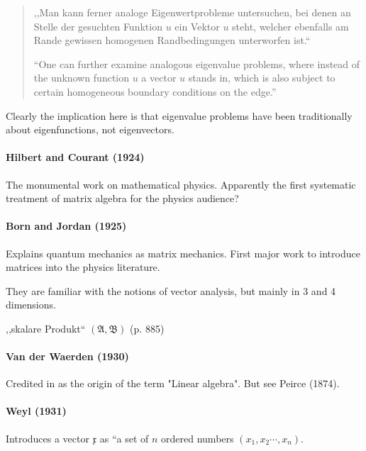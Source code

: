 \begin{quote}
,,Man kann ferner analoge Eigenwertprobleme untersuchen, bei denen an Stelle der gesuchten Funktion $u$ ein Vektor $u$ steht, welcher ebenfalls am Rande gewissen homogenen Randbedingungen unterworfen ist.``

``One can further examine analogous eigenvalue problems, where instead of the unknown function $u$ a vector $u$ stands in, which is also subject to certain homogeneous boundary conditions on the edge.''
\end{quote}

Clearly the implication here is that eigenvalue problems have been traditionally about eigenfunctions, not eigenvectors.



\paragraph{Hilbert and Courant (1924)}

The monumental work on mathematical physics. Apparently the first systematic treatment of matrix algebra for the physics audience?



\paragraph{Born and Jordan (1925)~\cite{Born1925}}

Explains quantum mechanics as matrix mechanics. First major work to introduce matrices into the physics literature.

They are familiar with the notions of vector analysis, but mainly in 3 and 4 dimensions.

,,skalare Produkt`` $(\mathfrak A, \mathfrak B)$ (p. 885)



\paragraph{ Van der Waerden (1930)}

Credited in \cite{Kleiner2007} as the origin of the term "Linear algebra". But see
Peirce (1874).



\paragraph{Weyl (1931)~\cite{Weyl1931}}

Introduces a vector $\mathfrak x$ as ``a set of $n$ ordered numbers $(x_1, x_2 \cdots, x_n)$.

